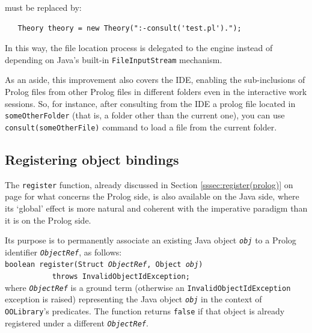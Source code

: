 \noindent must be replaced by:

\begin{verbatim}
   Theory theory = new Theory(":-consult('test.pl').");
\end{verbatim}

\noindent In this way, the file location process is delegated to the \tuprolog{} engine instead of depending on Java's built-in \texttt{FileInputStream} mechanism.

As an aside, this improvement also covers the \tuprolog{} IDE, enabling the sub-inclusions of Prolog files from other Prolog files in different folders even in the interactive work sessions.
So, for instance, after consulting from the IDE a prolog file located in \texttt{someOtherFolder} (that is, a folder other than the current one), you can use \texttt{consult(someOtherFile)} command to load a file from the current folder.


\subsection{Registering object bindings}
\label{ssec:register(Java)}

The \texttt{register} function, already discussed in Section \ref{sssec:register(prolog)} on page \pageref{sssec:register(prolog)} for what concerns the Prolog side, is also available on the Java side, where its `global' effect is more natural and coherent with the imperative paradigm than it is on the Prolog side.

Its purpose is to permanently associate an existing Java object \texttt{\textit{obj}} to a Prolog identifier \texttt{\textit{ObjectRef}}, as follows:\\

\texttt{boolean register(Struct \textit{ObjectRef}, Object \textit{obj})\\
    \mbox{~~~~~~~~~~~}throws InvalidObjectIdException;}\\

\noindent where \texttt{\textit{ObjectRef}} is a ground term (otherwise an \texttt{InvalidObjectIdException} exception is raised) representing the Java object \texttt{\textit{obj}} in the context of \texttt{OOLibrary}'s predicates.
The function returns \texttt{false} if that object is already registered under a different \texttt{\textit{ObjectRef}}.

